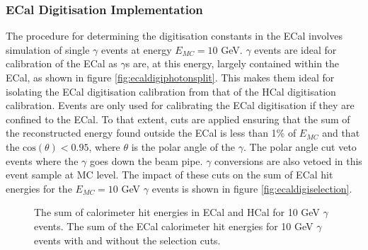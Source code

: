 \subsubsection{ECal Digitisation Implementation}
\label{sec:ecaldigi}
The procedure for determining the digitisation constants in the ECal involves simulation of single $\gamma$ events at energy $E_{MC} = 10$ GeV.  $\gamma$ events are ideal for calibration of the ECal as $\gamma$s are, at this energy, largely contained within the ECal, as shown in figure \ref{fig:ecaldigiphotonsplit}.  This makes them ideal for isolating the ECal digitisation calibration from that of the HCal digitisation calibration.  Events are only used for calibrating the ECal digitisation if they are confined to the ECal.  To that extent, cuts are applied ensuring that the sum of the reconstructed energy found outside the ECal is less than 1\% of $E_{MC}$ and that the $\text{cos}(\theta) < 0.95$, where $\theta$ is the polar angle of the $\gamma$.  The polar angle cut veto events where the $\gamma$ goes down the beam pipe.  $\gamma$ conversions are also vetoed in this event sample at MC level.  The impact of these cuts on the sum of ECal hit energies for the $E_{MC} = 10$ GeV $\gamma$ events is shown in figure \ref{fig:ecaldigiselection}.

\begin{figure}[h!]
\caption[\protect{} The sum of calorimeter hit energies in ECal and HCal for 10 GeV $\gamma$ events.  \protect{} The sum of the ECal calorimeter hit energies for 10 GeV $\gamma$ events with and without the selection cuts.]{\protect{} The sum of calorimeter hit energies in ECal and HCal for 10 GeV $\gamma$ events.  \protect{} The sum of the ECal calorimeter hit energies for 10 GeV $\gamma$ events with and without the selection cuts.}
\label{fig:ecaldigi}
\end{figure}


